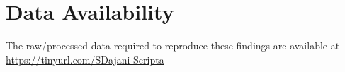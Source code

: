 \section*{Data Availability}
The raw/processed data required to reproduce these findings are available at \url{https://tinyurl.com/SDajani-Scripta}